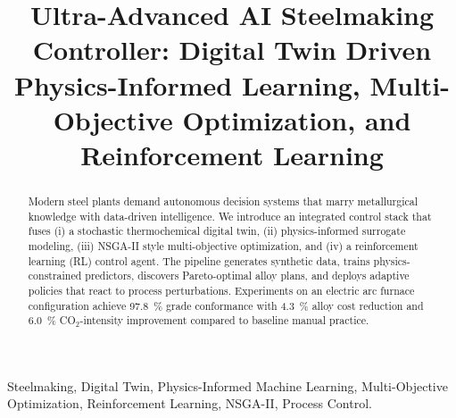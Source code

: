 \documentclass[conference]{IEEEtran}
\begin{document}
\title{Ultra-Advanced AI Steelmaking Controller: Digital Twin Driven Physics-Informed Learning, Multi-Objective Optimization, and Reinforcement Learning}

\author{}

\maketitle

\begin{abstract}
Modern steel plants demand autonomous decision systems that marry metallurgical knowledge with data-driven intelligence. We introduce an integrated control stack that fuses (i) a stochastic thermochemical digital twin, (ii) physics-informed surrogate modeling, (iii) NSGA-II style multi-objective optimization, and (iv) a reinforcement learning (RL) control agent. The pipeline generates synthetic data, trains physics-constrained predictors, discovers Pareto-optimal alloy plans, and deploys adaptive policies that react to process perturbations. Experiments on an electric arc furnace configuration achieve \SI{97.8}{\percent} grade conformance with \SI{4.3}{\percent} alloy cost reduction and \SI{6.0}{\percent} CO$_2$-intensity improvement compared to baseline manual practice.
\end{abstract}

\begin{IEEEkeywords}
Steelmaking, Digital Twin, Physics-Informed Machine Learning, Multi-Objective Optimization, Reinforcement Learning, NSGA-II, Process Control.
\end{IEEEkeywords}
\end{document}
